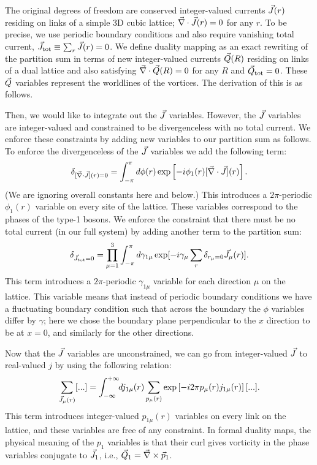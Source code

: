  The original degrees of freedom are conserved integer-valued currents $\vec{J}(r)$ residing on links of a simple 3D cubic lattice; $\vec{\nabla} \cdot \vec{J}(r) = 0$ for any $r$.  To be precise, we use periodic boundary conditions and also require vanishing total current, $\vec{J}_{\rm tot} \equiv \sum_r \vec{J}(r) = 0$.  We define duality mapping as an exact rewriting of the partition sum in terms of new integer-valued currents $\vec{Q}(R)$ residing on links of a dual lattice and also satisfying $\vec{\nabla} \cdot \vec{Q}(R) = 0$ for any $R$ and $\vec{Q}_{\rm tot} = 0$. These $\vec{Q}$ variables represent the worldlines of the vortices. The derivation of this is as follows.
 
 Then, we would like to integrate out the $\vec{J}$ variables. However, the $\vec{J}$ variables are integer-valued and constrained to be divergenceless with no total current. We enforce these constraints by adding new variables to our partition sum as follows.
To enforce the divergenceless of the $\vec{J}$ variables we add the following term:
\begin{equation}
\delta_{[\vec{\nabla}\cdot\vec{J}](r)=0}=\int_{-\pi}^{\pi} d\phi(r) \exp\left[-i\phi_1(r)[\vec{\nabla}\cdot\vec{J}](r)\right].
\label{zphi}
\end{equation}
(We are ignoring overall constants here and below.) This introduces a $2\pi$-periodic $\phi_1(r)$ variable on every site of the lattice. These variables correspond to the phases of the type-1 bosons. We enforce the constraint that there must be no total current (in our full system) by adding another term to the partition sum:
\begin{eqnarray}
\delta_{\vec{J}_{{\rm tot}}=0}=\prod_{\mu=1}^{3}\int_{-\pi}^{\pi} d\gamma_{1\mu} \exp[-i\gamma_{\mu}\sum_r \delta_{r_\mu=0}\vec{J}_{\mu}(r)].
\label{zgamma}
\end{eqnarray}
This term introduces a $2\pi$-periodic $\gamma_{1\mu}$ variable for each direction $\mu$ on the lattice. This variable means that instead of periodic boundary conditions we have a fluctuating boundary condition such that across the boundary the $\phi$ variables differ by $\gamma$; here we chose the boundary plane perpendicular to the $x$ direction to be at $x=0$, and similarly for the other directions.
 
 Now that the $\vec{J}$ variables are unconstrained, we can go from integer-valued $\vec{J}$ to real-valued $j$ by using the following relation:
\begin{equation*}
\sum_{\vec{J}_{\mu}(r)}[...]=\int_{-\infty}^{+\infty}\!\! dj_{1\mu}(r) \sum_{p_{\mu}(r)} \exp\left[-i2\pi p_{\mu}(r)j_{1\mu}(r)\right][...].
\end{equation*} 
This term introduces integer-valued $p_{1\mu}(r)$ variables on every link on the lattice, and these variables are free of any constraint.  In formal duality maps,\cite{PolyakovBook, Peskin1978, Dasgupta1981, FisherLee1989, LeeFisher1989, artphoton, short_range3} the physical meaning of the $p_1$ variables is that their curl gives vorticity in the phase variables conjugate to $\vec{J}_1$, i.e., ${\vec{Q}}_1 = \vec{\nabla} \times \vec{p}_1$.

